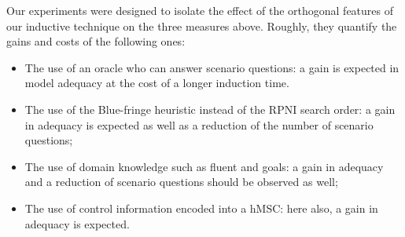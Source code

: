 Our experiments were designed to isolate the effect of the orthogonal features of our inductive technique on the three measures above. Roughly, they quantify the gains and costs of the following ones:
\begin{itemize}
\item The use of an oracle who can answer scenario questions: a gain is expected in model adequacy at the cost of a longer induction time.
\item The use of the Blue-fringe heuristic instead of the RPNI search order: a gain in adequacy is expected as well as a reduction of the number of scenario questions;
\item The use of domain knowledge such as fluent and goals: a gain in adequacy and a reduction of scenario questions should be observed as well;
\item The use of control information encoded into a hMSC: here also, a gain in adequacy is expected.
\end{itemize}

